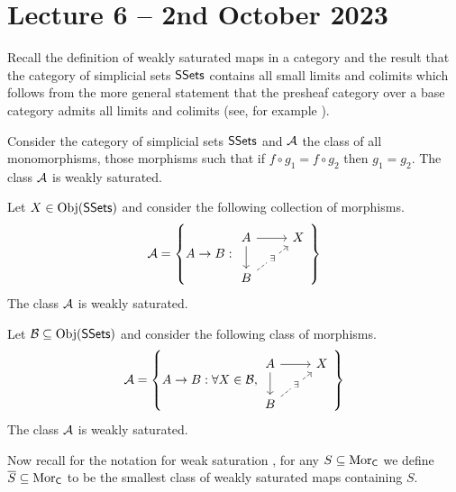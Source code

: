 \section{Lecture 6 -- 2nd October 2023}
Recall the definition of weakly saturated maps in a category  and the result that the category of simplicial sets $\mathsf{SSets}$ contains all small limits and colimits which follows from the more general statement that the presheaf category over a base category admits all limits and colimits (see, for example \cite[\href{https://stacks.math.columbia.edu/tag/00VB}{00VB}]{stacks-project}). 
\begin{example}
  Consider the category of simplicial sets $\mathsf{SSets}$ and $\mathcal{A}$ the class of all monomorphisms, those morphisms such that if $f\circ g_{1}=f\circ g_{2}$ then $g_{1}=g_{2}$. The class $\mathcal{A}$ is weakly saturated. 
\end{example}
\begin{example}
  Let $X\in\mathrm{Obj}(\mathsf{SSets})$ and consider the following collection of morphisms. 
  $$\Acal=\left\{A\to B:%
  \begin{tikzcd}
    A & X \\
    B
    \arrow["\exists"{description}, dashed, from=2-1, to=1-2]
    \arrow[from=1-1, to=1-2]
    \arrow[from=1-1, to=2-1]
  \end{tikzcd}\right\}$$
  The class $\mathcal{A}$ is weakly saturated. 
\end{example}
\begin{example}
  Let $\mathcal{B}\subseteq\mathrm{Obj}(\mathsf{SSets})$ and consider the following class of morphisms. 
  $$\Acal=\left\{A\to B:\forall X\in\Bcal, %
  \begin{tikzcd}
    A & X \\
    B
    \arrow["\exists"{description}, dashed, from=2-1, to=1-2]
    \arrow[from=1-1, to=1-2]
    \arrow[from=1-1, to=2-1]
  \end{tikzcd}\right\}$$
  The class $\mathcal{A}$ is weakly saturated. 
\end{example}
Now recall for the notation for weak saturation , for any $S\subseteq\mathrm{Mor}_{\mathsf{C}}$ we define $\overline{S}\subseteq\mathrm{Mor}_{\mathsf{C}}$ to be the smallest class of weakly saturated maps containing $S$. 
